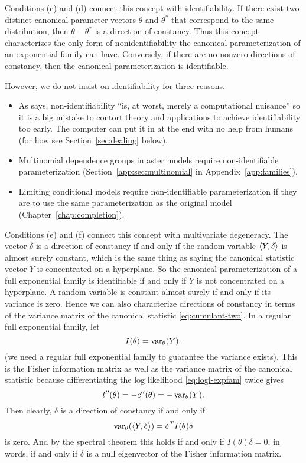 Conditions (c) and (d) connect this concept with identifiability.
If there exist two distinct canonical parameter vectors $\theta$ and $\theta^*$
that correspond to the same distribution, then $\theta - \theta^*$ is a
direction of constancy.  Thus this concept characterizes the only form
of nonidentifiability the canonical parameterization of an exponential
family can have.  Conversely, if there are no nonzero directions of constancy,
then the canonical parameterization is identifiable.

However, we do not insist on identifiability for three reasons.
\begin{itemize}
\item
As \citet{geyer-gdor} says, non-identifiability ``is, at worst, merely
a computational nuisance'' so it is a big mistake to contort theory
and applications to achieve identifiability too early.  The computer
can put it in at the end with no help from humans
(for how see Section~\ref{sec:dealing} below).
\item Multinomial dependence groups in aster models require
non-identifiable parameterization
(Section~\ref{app:sec:multinomial} in Appendix~\ref{app:families}).
\item Limiting conditional models require non-identifiable parameterization
if they are to use the same parameterization as the original model
(Chapter~\ref{chap:completion}).
\end{itemize}

Conditions (e) and (f) connect this concept with multivariate degeneracy.
The vector $\delta$ is a direction of constancy if and only if the random
variable $\langle Y, \delta \rangle$ is almost surely constant, which is the
same thing as saying the canonical statistic vector $Y$ is concentrated
on a hyperplane.  So the canonical parameterization of a full exponential
family is identifiable if and only if $Y$ is not concentrated on a hyperplane.
A random variable is constant almost surely if and only if its variance
is zero.  Hence we can also characterize directions of constancy in
terms of the variance matrix of the canonical statistic
\eqref{eq:cumulant-two}.  In a regular full exponential family, let
$$
   I(\theta) = \operatorname{var}_\theta(Y).
$$
(we need a regular full exponential family to guarantee the variance exists).
This is the Fisher information matrix as well as the variance matrix
of the canonical statistic because differentiating the log likelihood
\eqref{eq:logl-expfam} twice gives
$$
   l''(\theta) = - c''(\theta) = - \operatorname{var}_\theta(Y).
$$
Then clearly, $\delta$ is a direction of constancy if and only if
$$
   \operatorname{var}_\theta(\langle Y, \delta \rangle) = \delta^T I(\theta) \delta
$$
is zero.
And by the spectral theorem
\citet[Section~79]{halmos-vector-spaces} this holds if and only if
$I(\theta) \delta = 0$, in words, if and only if $\delta$ is a null
eigenvector of the Fisher information matrix.

